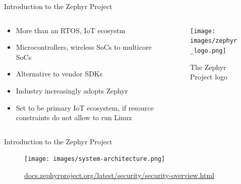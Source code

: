 \documentclass[10pt, aspectratio=169]{beamer}
\begin{document}
\begin{frame}[fragile]{Introduction to the Zephyr Project}
  \begin{columns}
    \begin{column}{0.6\textwidth}
      \begin{itemize}
        \item More than an RTOS, IoT ecosystm
        \item Microcontrollers, wireless SoCs to multicore SoCs
        \item Alternative to vendor SDKs
        \item Industry increasingly adopts Zephyr
        \item Set to be primary IoT ecosystem, if resource constraints do not allow to run Linux
      \end{itemize}
    \end{column}
    \begin{column}{0.4\textwidth}
      \begin{figure}
        \texttt{[image: images/zephyr\_logo.png]}
        \caption*{The Zephyr Project logo}
      \end{figure}
    \end{column}
  \end{columns}
\end{frame}
\begin{frame}[fragile]{Introduction to the Zephyr Project}
  \begin{figure}
    \texttt{[image: images/system-architecture.png]}
    \caption*{\href{https://docs.zephyrproject.org/latest/security/security-overview.html}{docs.zephyrproject.org/latest/security/security-overview.html}}
  \end{figure}
\end{frame}
\end{document}
